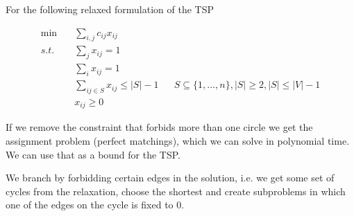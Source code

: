 \begin{Ex}[TSP] For the following relaxed formulation of the TSP

\begin{align*}
\min \quad & \sum_{i,j} c_{ij}x_{ij}\\
s.t. \quad & \sum_{j} x_{ij} = 1\\
	& \sum_{i} x_{ij} = 1\\
	& \sum_{ij\in S} x_{ij} \leq |S|-1 && S \subseteq \{1,\ldots,n\}, |S|\geq 2, |S| \leq |V|-1\\
	& x_{ij} \geq  0
\end{align*}

If we remove the constraint that forbids more than one circle we get the assignment problem (perfect matchings), which we can solve in polynomial time. We can use that as a bound for the TSP.

We branch by forbidding certain edges in the solution, i.e. we get some set of cycles from the relaxation, choose the shortest and create subproblems in which one of the edges on the cycle is fixed to 0.
\end{Ex}
